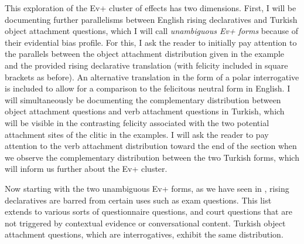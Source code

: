 \documentclass[output=paper,colorlinks,citecolor=brown]{langscibook}
\begin{document}
This exploration of the Ev+ cluster of effects has two dimensions. First, I will be
documenting further parallelisms between English rising declaratives and Turkish object attachment questions, which I will call \textit{unambiguous Ev+ forms} because of their evidential bias profile. For this, I ask the reader to initially pay attention to the parallels between the object attachment distribution given in the example and the provided rising declarative translation (with felicity included in square brackets as before). An alternative translation in the form of a polar interrogative is included to allow for a comparison to the felicitous neutral form in English. I will simultaneously be documenting the complementary distribution between object attachment questions and verb attachment questions in Turkish, which will be visible in the contrasting felicity associated with the two potential attachment sites of the clitic in the examples. I will ask the reader to pay attention to the verb attachment distribution toward the end of the section when we observe the complementary distribution between the two Turkish forms, which will inform us further about the Ev+ cluster.

Now starting with the two unambiguous Ev+ forms, as we have seen in , rising declaratives are barred from certain uses such as exam questions. This list extends to various sorts of questionnaire questions, and court questions that are not triggered by contextual evidence or conversational content. Turkish object attachment questions, which are interrogatives, exhibit the same distribution.

\end{document}
